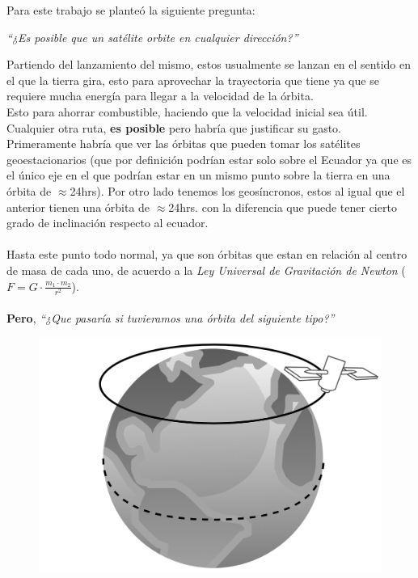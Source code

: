 Para este trabajo se planteó la siguiente pregunta: 

\begin{center}
\textit{``¿Es posible que un satélite orbite en cualquier dirección?''}
\end{center}

Partiendo del lanzamiento del mismo, estos usualmente se lanzan en el sentido en el que la tierra gira, esto para aprovechar la trayectoria que tiene ya que se requiere mucha energía para llegar a la velocidad de la órbita. \\
Esto para ahorrar combustible, haciendo que la velocidad inicial sea útil. Cualquier otra ruta, \textbf{es posible} pero habría que justificar su gasto.\\

Primeramente habría que ver las órbitas que pueden tomar los satélites geoestacionarios (que por definición podrían estar solo sobre el Ecuador ya que es el único eje en el que podrían estar en un mismo punto sobre la tierra en una órbita de $\approx$24hrs). Por otro lado tenemos los geosíncronos, estos al igual que el anterior tienen una órbita de $\approx$24hrs. con la diferencia que puede tener cierto grado de inclinación respecto al ecuador. \\{ }\\
Hasta este punto todo normal, ya que son órbitas que estan en relación al centro de masa de cada uno, de acuerdo a la \textit{Ley Universal de Gravitación de Newton} ($F=G\cdot\frac{m_1\cdot m_2}{r^2}$). \\{ }\\

\textbf{Pero}, \textit{``¿Que pasaría si tuvieramos una órbita del siguiente tipo?''}

\begin{figure}[ht!]
\centering
\includegraphics[scale=0.075]{imagenes/paralelo.png}
\end{figure}

